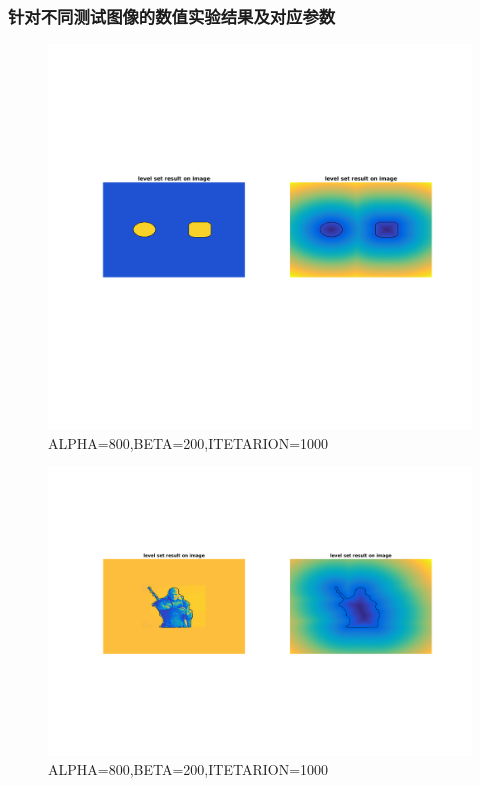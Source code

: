 \documentclass[a4paper, UTF8]{ctexrep}
\begin{document}
		\subsubsection{针对不同测试图像的数值实验结果及对应参数} %
		\label{ssub:针对不同测试图像的数值实验结果及对应参数}
			\begin{figure}[htbp!]
				\centering
				\includegraphics[width=\textwidth]{hw3_fig2.png}
				\caption{ALPHA=800,BETA=200,ITETARION=1000}
				\label{fig:figure1}
			\end{figure}
			\begin{figure}[htbp!]
				\centering
				\includegraphics[width=\textwidth]{hw3_fig3.png}
				\caption{ALPHA=800,BETA=200,ITETARION=1000}
				\label{fig:figure1}
			\end{figure}
\end{document}
